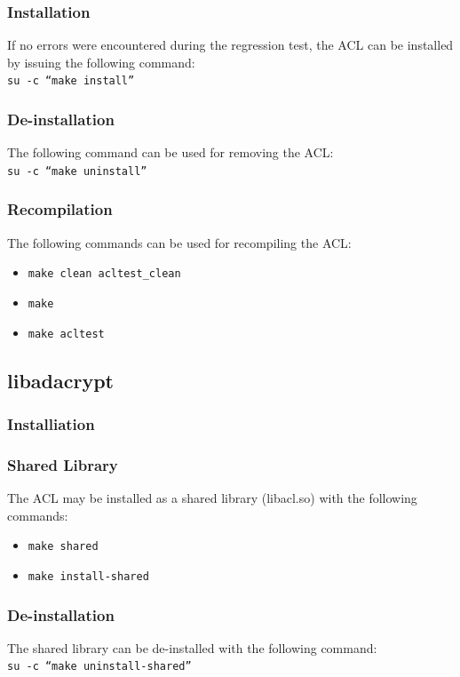\subsubsection{Installation}
If no errors were encountered during the regression test, the ACL can
be installed by issuing the following command:\\
\hspace*{1cm} \texttt{su -c ``make install''}\ \\

\subsubsection{De-installation}
The following command can be used for removing the ACL: \\
\hspace*{1cm} \texttt{su -c ``make uninstall''}\ \\

\subsubsection{Recompilation}
The following commands can be used for recompiling the ACL:\\
\begin{itemize}
\item \texttt{make clean acltest\_clean}
\item \texttt{make}
\item \texttt{make acltest}
\end{itemize}


\subsection{libadacrypt}
\subsubsection{Installiation}
\subsubsection{Shared Library}
The ACL may be installed as a shared library (libacl.so) with the following 
commands:
\begin{itemize}
\item \texttt{make shared}
\item \texttt{make install-shared}
\end{itemize}

\subsubsection{De-installation}
The shared library can be de-installed with the following command:\\
\hspace*{1cm} \texttt{su -c ``make uninstall-shared''}\ \\


